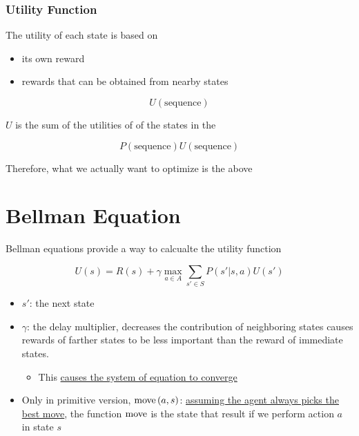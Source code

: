   \subsubsection{Utility Function}

    The utility of each state is based on

    \begin{itemize}
      \item its own reward
      \item rewards that can be obtained from nearby states
    \end{itemize}

    \begin{equation}
      U\left( \text{sequence} \right)
    \end{equation}

    $ U $ is the sum of the utilities of of the states in the

    \begin{equation}
      P\left( \text{sequence} \right) U\left( \text{sequence} \right)
    \end{equation}

    Therefore, what we actually want to optimize is the above

\section{Bellman Equation}

  Bellman equations provide a way to calcualte the utility function

  \begin{equation}
    U\left( s \right)
      = R\left( s \right)
      + \gamma \max_{a \in A} \sum_{s' \in S}
      P\left( s' | s, a \right)
      U\left( s' \right)
  \end{equation}

  \begin{itemize}
    \item $ s' $: the next state
    \item $ \gamma $: the delay multiplier, decreases the contribution of
    neighboring states causes rewards of farther states to be less important
    than the reward of immediate states.
    \begin{itemize}
      \item This \ul{causes the system of equation to converge}
    \end{itemize}

    \item Only in primitive version, $ \operatorname{move}\left( a, s \right) $:
    \ul{assuming the agent always picks the best move}, the function
    $ \operatorname{move} $ is the state that result if we perform action $ a $ in state $ s $
  \end{itemize}

